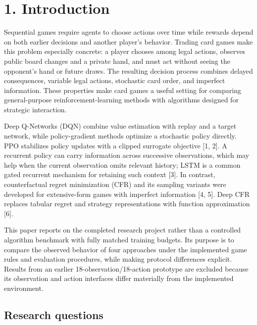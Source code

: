 \documentclass[11pt]{article}
\begin{document}
\section*{1. Introduction}

Sequential games require agents to choose actions over time while rewards depend on both earlier decisions and another player's behavior. Trading card games make this problem especially concrete: a player chooses among legal actions, observes public board changes and a private hand, and must act without seeing the opponent's hand or future draws. The resulting decision process combines delayed consequences, variable legal actions, stochastic card order, and imperfect information. These properties make card games a useful setting for comparing general-purpose reinforcement-learning methods with algorithms designed for strategic interaction.

Deep Q-Networks (DQN) combine value estimation with replay and a target network, while policy-gradient methods optimize a stochastic policy directly. PPO stabilizes policy updates with a clipped surrogate objective [1, 2]. A recurrent policy can carry information across successive observations, which may help when the current observation omits relevant history; LSTM is a common gated recurrent mechanism for retaining such context [3]. In contrast, counterfactual regret minimization (CFR) and its sampling variants were developed for extensive-form games with imperfect information [4, 5]. Deep CFR replaces tabular regret and strategy representations with function approximation [6].

This paper reports on the completed research project rather than a controlled algorithm benchmark with fully matched training budgets. Its purpose is to compare the observed behavior of four approaches under the implemented game rules and evaluation procedures, while making protocol differences explicit. Results from an earlier 18-observation/18-action prototype are excluded because its observation and action interfaces differ materially from the implemented environment.

\subsection*{Research questions}
\end{document}
